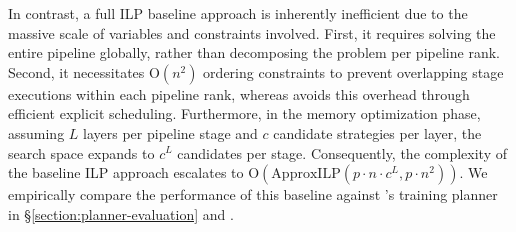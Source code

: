 In contrast, a full ILP baseline approach is inherently inefficient due to the massive scale of variables and constraints involved.
First, it requires solving the entire pipeline globally, rather than decomposing the problem per pipeline rank.
Second, it necessitates $\mathrm O(n^2)$ ordering constraints to prevent overlapping stage executions within each pipeline rank, whereas {\sys} avoids this overhead through efficient explicit scheduling.
Furthermore, in the memory optimization phase, assuming $L$ layers per pipeline stage and $c$ candidate strategies per layer, the search space expands to $c^L$ candidates per stage.
Consequently, the complexity of the baseline ILP approach escalates to $\mathrm O(\mathrm{ApproxILP}(p \cdot n \cdot c^L, p \cdot n^2))$.
We empirically compare the performance of this baseline against {\sys}'s training planner in \S\ref{section:planner-evaluation} and .
